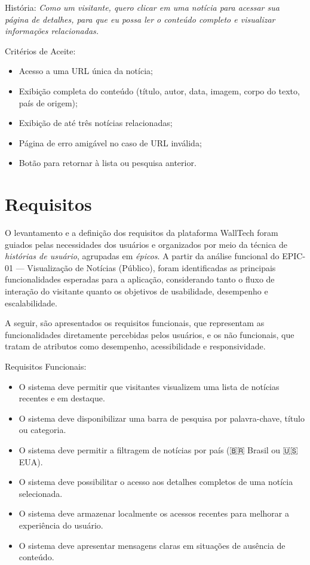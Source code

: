 \noindent História: \textit{Como um visitante, quero clicar em uma notícia para acessar sua página de detalhes, para que eu possa ler o conteúdo completo e visualizar informações relacionadas.}

\noindent Critérios de Aceite:
\begin{itemize}
  \item Acesso a uma URL única da notícia;
  \item Exibição completa do conteúdo (título, autor, data, imagem, corpo do texto, país de origem);
  \item Exibição de até três notícias relacionadas;
  \item Página de erro amigável no caso de URL inválida;
  \item Botão para retornar à lista ou pesquisa anterior.
\end{itemize}









\section{Requisitos}
\label{section:requisitos}

O levantamento e a definição dos requisitos da plataforma WallTech foram guiados pelas necessidades dos usuários e organizados por meio da técnica de \textit{histórias de usuário}, agrupadas em \textit{épicos}. A partir da análise funcional do EPIC-01 — Visualização de Notícias (Público), foram identificadas as principais funcionalidades esperadas para a aplicação, considerando tanto o fluxo de interação do visitante quanto os objetivos de usabilidade, desempenho e escalabilidade.

A seguir, são apresentados os requisitos funcionais, que representam as funcionalidades diretamente percebidas pelos usuários, e os não funcionais, que tratam de atributos como desempenho, acessibilidade e responsividade.

Requisitos Funcionais:
\begin{itemize}
  \item O sistema deve permitir que visitantes visualizem uma lista de notícias recentes e em destaque.
  \item O sistema deve disponibilizar uma barra de pesquisa por palavra-chave, título ou categoria.
  \item O sistema deve permitir a filtragem de notícias por país (🇧🇷 Brasil ou 🇺🇸 EUA).
  \item O sistema deve possibilitar o acesso aos detalhes completos de uma notícia selecionada.
  \item O sistema deve armazenar localmente os acessos recentes para melhorar a experiência do usuário.
  \item O sistema deve apresentar mensagens claras em situações de ausência de conteúdo.
\end{itemize}

